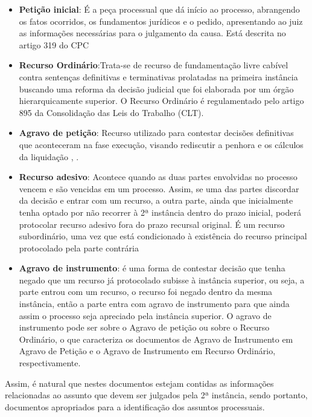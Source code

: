 \begin{itemize}
\item \textbf{Petição inicial}: É a peça processual que dá início ao processo, abrangendo os fatos ocorridos, os fundamentos jurídicos e o pedido, apresentando ao juiz as informações necessárias para o julgamento da causa. Está descrita no artigo 319 do CPC \cite{novocpc}

\item \textbf{Recurso Ordinário}:Trata-se de recurso de fundamentação livre cabível contra sentenças definitivas e terminativas prolatadas na primeira instância buscando uma reforma da decisão judicial que foi elaborada por um órgão hierarquicamente superior. O Recurso Ordinário é regulamentado pelo artigo 895 da Consolidação das Leis do Trabalho (CLT)\cite{recursos}.

\item \textbf{Agravo de petição}: Recurso utilizado para contestar decisões definitivas que aconteceram na fase execução, visando rediscutir a penhora e os cálculos da liquidação \cite{recursos}, \cite{agravopeticao}.

\item \textbf{Recurso adesivo}: Acontece quando as duas partes envolvidas no processo vencem e são vencidas em um processo. Assim, se uma das partes discordar da decisão e entrar com um recurso, a outra parte, ainda que inicialmente tenha optado por não recorrer à 2ª instância dentro do prazo inicial, poderá protocolar recurso adesivo fora do prazo recursal original. É um recurso subordinário, uma vez que está condicionado à existência do recurso principal protocolado pela parte contrária \cite{recursos}

\item \textbf{Agravo de instrumento}: é uma forma de contestar decisão que tenha negado que um recurso já protocolado subisse à instância superior, ou seja, a parte entrou com um recurso, o recurso foi negado dentro da mesma instância, então a parte entra com agravo de instrumento para que ainda assim o processo seja apreciado pela instância superior. O agravo de instrumento pode ser sobre o Agravo de petição ou sobre o Recurso Ordinário, o que caracteriza os documentos de Agravo de Instrumento em Agravo de Petição e o Agravo de Instrumento em Recurso Ordinário, respectivamente. \cite{agravoinstrumento}
\end{itemize}

    Assim, é natural que nestes documentos estejam contidas as informações relacionadas ao assunto que devem ser julgados pela 2ª instância, sendo portanto,  documentos apropriados para a identificação dos assuntos processuais. 
    

